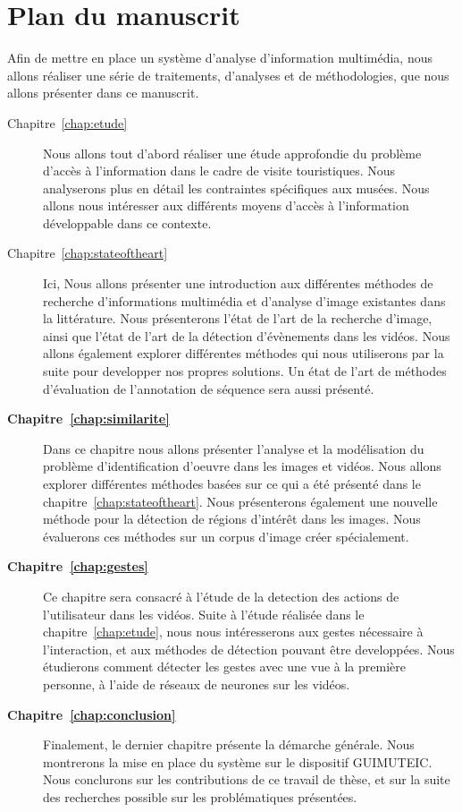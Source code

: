 \section{Plan du manuscrit}

Afin de mettre en place un système d'analyse d'information multimédia, nous allons réaliser une série de traitements, d'analyses et de méthodologies, que nous allons présenter dans ce manuscrit. 


\begin{description}
	\item[Chapitre~\ref{chap:etude}~] Nous allons tout d'abord réaliser une étude approfondie du problème d'accès à l'information dans le cadre de visite touristiques. Nous analyserons plus en détail les contraintes spécifiques aux musées. Nous allons nous intéresser aux différents moyens d'accès à l'information développable dans ce contexte. 

	\item[Chapitre~\ref{chap:stateoftheart}~] Ici, Nous allons présenter une introduction aux différentes méthodes de recherche d'informations multimédia et d'analyse d'image existantes dans la littérature. Nous présenterons l'état de l'art de la recherche d'image, ainsi que l'état de l'art de la détection d'évènements dans les vidéos. Nous allons également explorer différentes méthodes qui nous utiliserons par la suite pour developper nos propres solutions. Un état de l'art de méthodes d'évaluation de l'annotation de séquence sera aussi présenté.

	\item[\textbf{Chapitre~\ref{chap:similarite}~}] Dans ce chapitre nous allons présenter l'analyse et la modélisation du problème d'identification d'oeuvre dans les images et vidéos. Nous allons explorer différentes méthodes basées sur ce qui a été présenté dans le chapitre~\ref{chap:stateoftheart}. Nous présenterons également une nouvelle méthode pour la détection de régions d'intérêt dans les images. Nous évaluerons ces méthodes sur un corpus d'image créer spécialement.  

	\item[\textbf{Chapitre~\ref{chap:gestes}~}] Ce chapitre sera consacré à l'étude de la detection des actions de l'utilisateur dans les vidéos. 
	Suite à l'étude réalisée dans le chapitre~\ref{chap:etude}, nous nous intéresserons aux gestes nécessaire à l'interaction, et aux méthodes de détection pouvant être developpées. Nous étudierons comment détecter les gestes avec une vue à la première personne, à l'aide de réseaux de neurones sur les vidéos.

	\item[\textbf{Chapitre~\ref{chap:conclusion}~}] Finalement, le dernier chapitre présente la démarche générale. Nous montrerons la mise en place du système sur le dispositif GUIMUTEIC. Nous conclurons sur les contributions de ce travail de thèse, et sur la suite des recherches possible sur les problématiques présentées.

\end{description}

